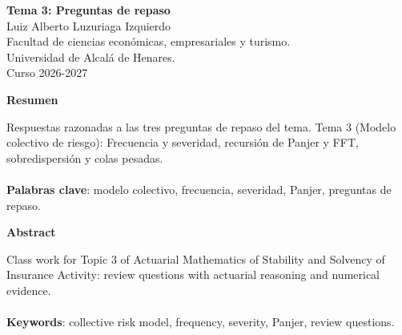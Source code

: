\documentclass[a4paper,12pt]{article}
\begin{document}
\begin{titlepage}
    \centering
    \vspace*{0.1cm}
    \huge\textbf{Tema 3: Preguntas de repaso}\\
    \vspace{1cm}
    \small{Luiz Alberto Luzuriaga Izquierdo}\\
    \vspace{0.1cm}
    Facultad de ciencias económicas, empresariales y turismo. \\
    \vspace{0.1cm}
    Universidad de Alcalá de Henares. \\
    \vspace{0.1cm}
    Curso 2026-2027\\
    \vspace{0.5cm}

{\bfseries Resumen}

\vspace{0.1cm}
\noindent
\begin{justify}
Respuestas razonadas a las tres preguntas de repaso del tema. Tema 3 (Modelo colectivo de riesgo): Frecuencia y severidad, recursión de Panjer y FFT, sobredispersión y colas pesadas.\\\\
\vspace{0.1cm}
\noindent
\textbf{Palabras clave}: modelo colectivo, frecuencia, severidad, Panjer, preguntas de repaso.
\end{justify}
\begin{center}
    {\bfseries Abstract}
\end{center}
\vspace{0.1cm}
\noindent
\begin{justify}
Class work for Topic 3 of Actuarial Mathematics of Stability and Solvency of Insurance Activity: review questions with actuarial reasoning and numerical evidence.\\\\
\vspace{0.1cm}
\noindent
\textbf{Keywords}: collective risk model, frequency, severity, Panjer, review questions.
\end{justify}

\end{titlepage}

\newpage{}
\renewcommand{\contentsname}{Índice}
\tableofcontents
\end{document}
